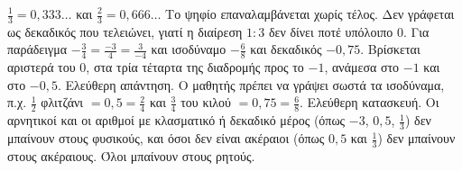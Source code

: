  $\frac{1}{3}=0{,}333\ldots$ και $\frac{2}{3}=0{,}666\ldots$ Το ψηφίο επαναλαμβάνεται χωρίς τέλος. Δεν γράφεται ως δεκαδικός που τελειώνει, γιατί η διαίρεση $1:3$ δεν δίνει ποτέ υπόλοιπο $0$.
 Για παράδειγμα $-\frac{3}{4}=\frac{-3}{4}=\frac{3}{-4}$ και ισοδύναμο $-\frac{6}{8}$ και δεκαδικός $-0{,}75$. Βρίσκεται αριστερά του $0$, στα τρία τέταρτα της διαδρομής προς το $-1$, ανάμεσα στο $-1$ και στο $-0{,}5$.
 Ελεύθερη απάντηση. Ο μαθητής πρέπει να γράψει σωστά τα ισοδύναμα, π.χ. $\frac{1}{2}$ φλιτζάνι $=0{,}5=\frac{2}{4}$ και $\frac{3}{4}$ του κιλού $=0{,}75=\frac{6}{8}$.
 Ελεύθερη κατασκευή. Οι αρνητικοί και οι αριθμοί με κλασματικό ή δεκαδικό μέρος (όπως $-3$, $0{,}5$, $\frac{1}{3}$) δεν μπαίνουν στους φυσικούς, και όσοι δεν είναι ακέραιοι (όπως $0{,}5$ και $\frac{1}{3}$) δεν μπαίνουν στους ακέραιους. Όλοι μπαίνουν στους ρητούς.
